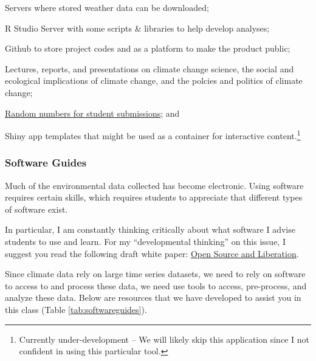 \documentclass{article}\usepackage[]{graphicx}\usepackage[]{color}
\newenvironment{itemize*}%
  {\begin{itemize}%
    \setlength{\itemsep}{0pt}%
    \setlength{\parskip}{0pt}}%
  {\end{itemize}}
\begin{document}
\begin{itemize*}
  \item Servers where stored weather data can be downloaded;
  \item R Studio Server with some scripts \& libraries to help develop analyses;
  \item Github to store project codes and as a platform to make the product public;
  \item Lectures, reports, and presentations on climate change science, the social and ecological implications of climate change, and the polcies and politics of climate change;
  \item \href{https://github.com/marclos/Climate_Change_Narratives/raw/master/Admin/RandomNumbers.pdf}{Random numbers for student submissions}; and
  \item Shiny app templates that might be used as a container for interactive content.\footnote{Currently under-development -- We will likely skip this application since I not confident in using this particular tool.}
\end{itemize*}

\subsubsection{Software Guides}

Much of the environmental data collected has become electronic. Using software requires certain skills, which requires students to appreciate that different types of software exist. 

In particular, I am constantly thinking critically about what software I advise students to use and learn. For my ``developmental thinking'' on this issue, I suggest you read the following draft white paper: \href{https://github.com/marclos/Climate_Change_Narratives/raw/master/Admin/Liberation_via_Open_Source_Software.pdf}{Open Source and Liberation}. 

Since climate data rely on large time series datasets, we need to rely on software to access to and process these data, we need use tools to access, pre-process, and analyze these data. Below are resources that we have developed to assist you in this class (Table \ref{tab:softwareguides}).
\end{document}
